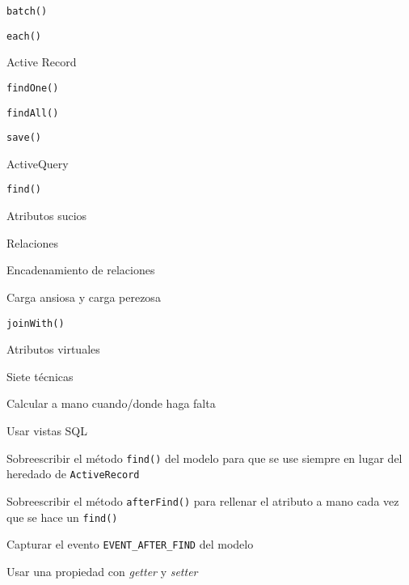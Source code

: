 \begin{longenum}
\begin{longenum}
\begin{longenum}
            \begin{longenum}
                \item \texttt{batch()}
                \item \texttt{each()}
            \end{longenum}
        \end{longenum}
        \item Active Record
        \begin{longenum}
            \item \texttt{findOne()}
            \item \texttt{findAll()}
            \item \texttt{save()}
            \item ActiveQuery
            \begin{longenum}
                \item \texttt{find()}
            \end{longenum}
            \item Atributos sucios
            \item Relaciones
            \begin{longenum}
                \item Encadenamiento de relaciones
            \end{longenum}
            \item Carga ansiosa y carga perezosa
            \item \texttt{joinWith()}
            \item Atributos virtuales
            \begin{longenum}
                \item Siete técnicas
                \begin{longenum}
                    \item Calcular a mano cuando/donde haga falta
                    \item Usar vistas SQL
                    \item Sobreescribir el método \texttt{find()} del modelo para que se use siempre en lugar del heredado de \texttt{ActiveRecord}
                    \item Sobreescribir el método \texttt{afterFind()} para rellenar el atributo a mano cada vez que se hace un \texttt{find()}
                    \item Capturar el evento \texttt{EVENT\_AFTER\_FIND} del modelo
                    \item Usar una propiedad con \textit{getter} y \textit{setter}

\end{longenum}
\end{longenum}
\end{longenum}
\end{longenum}
\end{longenum}

